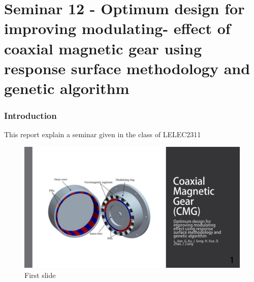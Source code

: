 \part{Seminar 12 - Optimum design for improving modulating-
effect of coaxial magnetic gear using
response surface methodology and genetic
algorithm}


\section{Introduction}

This report explain a seminar given in the class of LELEC2311 
\begin{figure}[H]
\centering
\includegraphics[page={1},scale=0.3]{LELEC2311.allow.pdf}
\caption{First slide}
\label{fig:first slide}
\end{figure}

